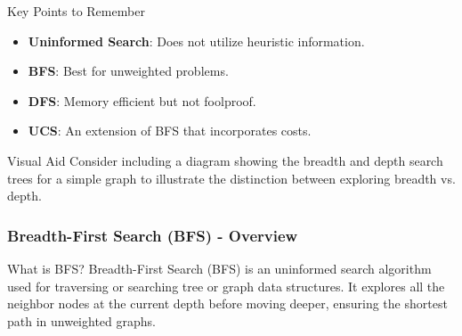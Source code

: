 \documentclass[aspectratio=169]{beamer}
\begin{document}
\begin{frame}[fragile]{Key Points to Remember}
    \begin{itemize}
        \item \textbf{Uninformed Search}: Does not utilize heuristic information.
        \item \textbf{BFS}: Best for unweighted problems.
        \item \textbf{DFS}: Memory efficient but not foolproof.
        \item \textbf{UCS}: An extension of BFS that incorporates costs.
    \end{itemize}
    
    \begin{block}{Visual Aid}
        Consider including a diagram showing the breadth and depth search trees for a simple graph to illustrate the distinction between exploring breadth vs. depth.
    \end{block}
\end{frame}

\begin{frame}[fragile]
    \frametitle{Breadth-First Search (BFS) - Overview}
    \begin{block}{What is BFS?}
        Breadth-First Search (BFS) is an uninformed search algorithm used for traversing or searching tree or graph data structures. It explores all the neighbor nodes at the current depth before moving deeper, ensuring the shortest path in unweighted graphs.
    \end{block}
\end{frame}
\end{document}
